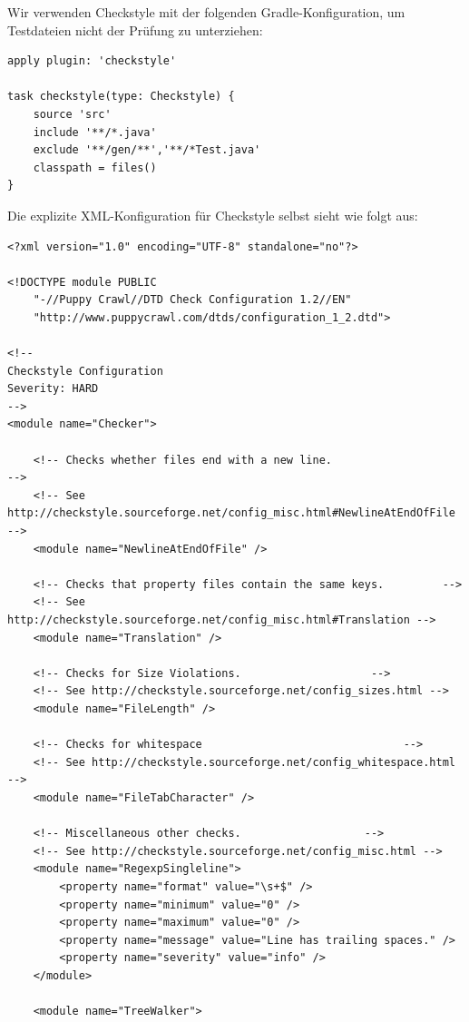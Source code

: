 Wir verwenden Checkstyle mit der folgenden Gradle-Konfiguration, um Testdateien nicht der Prüfung zu unterziehen:

\begin{lstlisting}
apply plugin: 'checkstyle'

task checkstyle(type: Checkstyle) {
    source 'src'
    include '**/*.java'
    exclude '**/gen/**','**/*Test.java'
    classpath = files()
}
\end{lstlisting}

Die explizite XML-Konfiguration für Checkstyle selbst sieht wie folgt aus:

\begin{lstlisting}
<?xml version="1.0" encoding="UTF-8" standalone="no"?>

<!DOCTYPE module PUBLIC
    "-//Puppy Crawl//DTD Check Configuration 1.2//EN"
    "http://www.puppycrawl.com/dtds/configuration_1_2.dtd">

<!--
Checkstyle Configuration
Severity: HARD
-->
<module name="Checker">

    <!-- Checks whether files end with a new line.                        -->
    <!-- See http://checkstyle.sourceforge.net/config_misc.html#NewlineAtEndOfFile -->
    <module name="NewlineAtEndOfFile" />

    <!-- Checks that property files contain the same keys.         -->
    <!-- See http://checkstyle.sourceforge.net/config_misc.html#Translation -->
    <module name="Translation" />

    <!-- Checks for Size Violations.                    -->
    <!-- See http://checkstyle.sourceforge.net/config_sizes.html -->
    <module name="FileLength" />

    <!-- Checks for whitespace                               -->
    <!-- See http://checkstyle.sourceforge.net/config_whitespace.html -->
    <module name="FileTabCharacter" />

    <!-- Miscellaneous other checks.                   -->
    <!-- See http://checkstyle.sourceforge.net/config_misc.html -->
    <module name="RegexpSingleline">
        <property name="format" value="\s+$" />
        <property name="minimum" value="0" />
        <property name="maximum" value="0" />
        <property name="message" value="Line has trailing spaces." />
        <property name="severity" value="info" />
    </module>

    <module name="TreeWalker">


\end{lstlisting}
